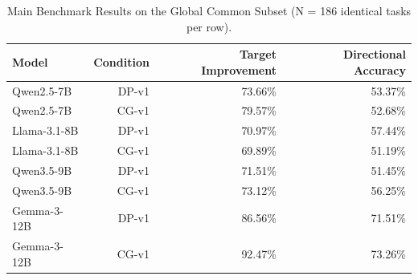 \begin{table}[htbp]
\centering
\caption{Main Benchmark Results on the Global Common Subset (N = 186 identical tasks per row).}
\label{tab:table6_global_common}
\begin{tabular}{lrrr}
\toprule
Model & Condition & Target Improvement & Directional Accuracy \\
\midrule
Qwen2.5-7B & DP-v1 & 73.66\% & 53.37\% \\
Qwen2.5-7B & CG-v1 & 79.57\% & 52.68\% \\
Llama-3.1-8B & DP-v1 & 70.97\% & 57.44\% \\
Llama-3.1-8B & CG-v1 & 69.89\% & 51.19\% \\
Qwen3.5-9B & DP-v1 & 71.51\% & 51.45\% \\
Qwen3.5-9B & CG-v1 & 73.12\% & 56.25\% \\
Gemma-3-12B & DP-v1 & 86.56\% & 71.51\% \\
Gemma-3-12B & CG-v1 & 92.47\% & 73.26\% \\
\bottomrule
\end{tabular}
\end{table}
